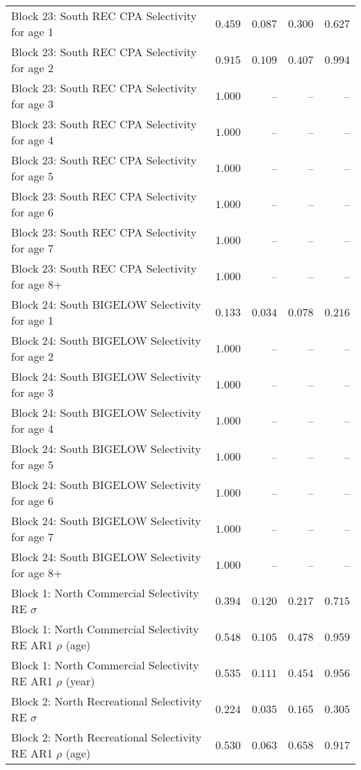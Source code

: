 \documentclass[
]{article}
\begin{document}
\begin{landscape}
\begin{longtable}[t]{lrrrr}
Block 23: South REC CPA Selectivity for age 1 & $0.459$ & $0.087$ & $0.300$ & $0.627$\\
Block 23: South REC CPA Selectivity for age 2 & $0.915$ & $0.109$ & $0.407$ & $0.994$\\
\addlinespace
Block 23: South REC CPA Selectivity for age 3 & $1.000$ & -- & -- & --\\
Block 23: South REC CPA Selectivity for age 4 & $1.000$ & -- & -- & --\\
Block 23: South REC CPA Selectivity for age 5 & $1.000$ & -- & -- & --\\
Block 23: South REC CPA Selectivity for age 6 & $1.000$ & -- & -- & --\\
Block 23: South REC CPA Selectivity for age 7 & $1.000$ & -- & -- & --\\
\addlinespace
Block 23: South REC CPA Selectivity for age 8+ & $1.000$ & -- & -- & --\\
Block 24: South BIGELOW Selectivity for age 1 & $0.133$ & $0.034$ & $0.078$ & $0.216$\\
Block 24: South BIGELOW Selectivity for age 2 & $1.000$ & -- & -- & --\\
Block 24: South BIGELOW Selectivity for age 3 & $1.000$ & -- & -- & --\\
Block 24: South BIGELOW Selectivity for age 4 & $1.000$ & -- & -- & --\\
\addlinespace
Block 24: South BIGELOW Selectivity for age 5 & $1.000$ & -- & -- & --\\
Block 24: South BIGELOW Selectivity for age 6 & $1.000$ & -- & -- & --\\
Block 24: South BIGELOW Selectivity for age 7 & $1.000$ & -- & -- & --\\
Block 24: South BIGELOW Selectivity for age 8+ & $1.000$ & -- & -- & --\\
Block 1: North Commercial Selectivity RE $\sigma$ & $0.394$ & $0.120$ & $0.217$ & $0.715$\\
\addlinespace
Block 1: North Commercial Selectivity RE AR1 $\rho$ (age) & $0.548$ & $0.105$ & $0.478$ & $0.959$\\
Block 1: North Commercial Selectivity RE AR1 $\rho$ (year) & $0.535$ & $0.111$ & $0.454$ & $0.956$\\
Block 2: North Recreational Selectivity RE $\sigma$ & $0.224$ & $0.035$ & $0.165$ & $0.305$\\
Block 2: North Recreational Selectivity RE AR1 $\rho$ (age) & $0.530$ & $0.063$ & $0.658$ & $0.917$\\

\end{longtable}
\end{landscape}
\end{document}
